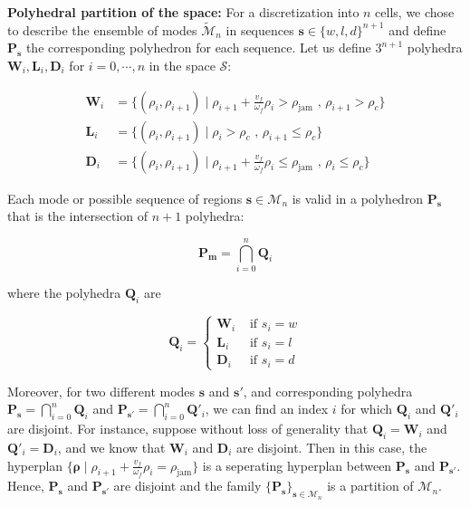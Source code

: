 \hspace{10mm}

\noindent\textbf{Polyhedral partition of the space:} For a discretization into $n$ cells, we chose to describe the ensemble of modes $\tilde{\mathcal{M}}_{n}$ in sequences $\boldsymbol s \in \{w,l,d\}^{n+1}$ and define $\textbf{P}_{\boldsymbol s}$ the corresponding polyhedron for each sequence. Let us define $3^{n+1}$ polyhedra $\textbf{W}_{i}, \textbf{L}_{i}, \textbf{D}_{i}$ for $i=0,\cdots,n$ in the space $\mathcal{S}$:

\begin{equation}
\begin{array}{ll}
\textbf{W}_{i} & = \{(\rho_{i},\rho_{i+1}) \mid \rho_{i+1} + \frac{v_{f}}{\omega_{f}}\rho_{i} > \rho_{\text{jam}} \text{ ,   } \rho_{i+1} > \rho_{c}\}\\
\textbf{L}_{i} & = \{(\rho_{i},\rho_{i+1}) \mid \rho_{i} > \rho_{c} \text{ ,   } \rho_{i+1} \leq \rho_{c}\}\\
\textbf{D}_{i} & = \{(\rho_{i},\rho_{i+1}) \mid \rho_{i+1} + \frac{v_{f}}{\omega_{f}}\rho_{i} \leq \rho_{\text{jam}} \text{ ,   } \rho_{i} \leq \rho_{c}\}
\end{array}
\label{eq:regions3}
\end{equation}

\noindent Each mode or possible sequence of regions $\boldsymbol s \in \mathcal{M}_{n}$ is valid in a polyhedron $\textbf{P}_{\boldsymbol s}$ that is the intersection of $n+1$ polyhedra:

\begin{equation}
\textbf{P}_{\boldsymbol m}=\bigcap_{i=0}^{n} \textbf{Q}_{i}
\label{eq:Hrepresentation}
\end{equation}

\noindent where the polyhedra $\textbf{Q}_{i}$ are

\begin{equation}
\textbf{Q}_{i}=
\begin{cases}
\textbf{W}_{i} & \text{ if } s_{i}=w\\
\textbf{L}_{i} & \text{ if } s_{i}=l\\
\textbf{D}_{i} & \text{ if } s_{i}=d
\end{cases}
\label{eq:Hrepresentation2}
\end{equation}


Moreover, for two different modes $\boldsymbol s$ and $\boldsymbol s'$, and corresponding polyhedra $\textbf{P}_{\boldsymbol s}=\bigcap_{i=0}^{n} \textbf{Q}_{i}$ and $\textbf{P}_{\boldsymbol s'}=\bigcap_{i=0}^{n} \textbf{Q}'_{i}$, we can find an index $i$ for which $\textbf{Q}_{i}$ and $\textbf{Q}'_{i}$ are disjoint. For instance, suppose without loss of generality that $\textbf{Q}_{i}=\textbf{W}_{i}$ and $\textbf{Q}'_{i}=\textbf{D}_{i}$, and we know that $\textbf{W}_{i}$ and $\textbf{D}_{i}$ are disjoint. Then in this case, the hyperplan $\{\boldsymbol \rho\mid\rho_{i+1} + \frac{v_{f}}{\omega_{f}}\rho_{i} = \rho_{\text{jam}}\}$ is a seperating hyperplan between $\textbf{P}_{\boldsymbol s}$ and $\textbf{P}_{\boldsymbol s'}$. Hence, $\textbf{P}_{\boldsymbol s}$ and $\textbf{P}_{\boldsymbol s'}$ are disjoint and the family $\{\textbf{P}_{\boldsymbol s}\}_{\boldsymbol s \in \mathcal{M}_{n}}$ is a partition of $\mathcal{M}_{n}$.